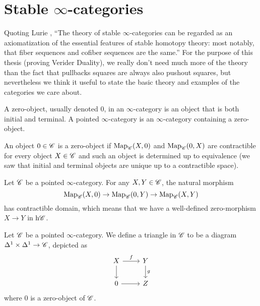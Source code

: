 \documentclass[../../thesis.tex]{subfiles}
\begin{document}
\section{Stable $\infty$-categories}
Quoting Lurie \cite{HA}, ``The theory of stable $\infty$-categories can be regarded as an axiomatization of the essential features of stable homotopy theory: most notably, that fiber sequences and cofiber sequences are the same.''
For the purpose of this thesis (proving Verider Duality), we really don't need much more of the theory than the fact that pullbacks squares are always also pushout squares, but nevertheless we think it useful to state the basic theory and examples of the categories we care about.
\begin{definition}[{\cite[Definition 1.1.1.1.]{HA}}]
    A zero-object, usually denoted $0$, in an $\infty$-category is an object that is both initial and terminal.
    A pointed $\infty$-category is an $\infty$-category containing a zero-object.
\end{definition}
\begin{remark}
    An object $0\in \mathscr{C}$ is a zero-object if $\mathrm{Map}_{\mathscr{C}}(X,0)$ and $\mathrm{Map}_{\mathscr{C}}(0,X)$ are contractible for every object $X\in \mathscr{C}$ and such an object is determined up to equivalence (we saw that initial and terminal objects are unique up to a contractible space).
\end{remark}
\begin{remark}[{\cite[Remark 1.1.1.3.]{HA}}]
    Let $\mathscr{C}$ be a pointed $\infty$-category.
    For any $X,Y \in \mathscr{C}$, the natural morphism
    \[
        \mathrm{Map}_{\mathscr{C}}(X, 0) \to \mathrm{Map}_{\mathscr{C}}(0, Y) \to \mathrm{Map}_{\mathscr{C}}(X,Y)
    \]
    has contractible domain, which means that we have a well-defined zero-morphism $X\to Y$ in $\mathrm{h}\mathscr{C}$.
\end{remark}
\begin{definition}[{\cite[Definition 1.1.1.4.]{HA}}]
    Let $\mathscr{C}$ be a pointed $\infty$-category.
    We define a triangle in $\mathscr{C}$ to be a diagram $\Delta^1 \times \Delta^1 \to \mathscr{C}$, depicted as
    \begin{equation}\label{triangle}\begin{tikzcd}
            X & Y \\
            0 & Z
            \arrow["f", from=1-1, to=1-2]
            \arrow[from=2-1, to=2-2]
            \arrow["g", from=1-2, to=2-2]
            \arrow[from=1-1, to=2-1]
        \end{tikzcd}\end{equation}
    where $0$ is a zero-object of $\mathscr{C}$.
\end{definition}
\end{document}
